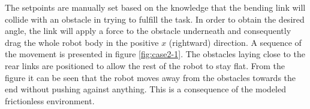 The setpoints are manually set based on the knowledge that the bending link will collide with an obstacle in trying to fulfill the task. In order to obtain the desired angle, the link will apply a force to the obstacle underneath and consequently drag the whole robot body in the positive $x$ (rightward) direction. A sequence of the movement is presented in figure \ref{fig:case2-1}. The obstacles laying close to the rear links are positioned to allow the rest of the robot to stay flat. From the figure it can be seen that the robot moves away from the obstacles towards the end without pushing against anything. This is a consequence of the modeled frictionless environment.

\begin{figure}[h!]
    \centering
    
    \hfil
    

\end{figure}

